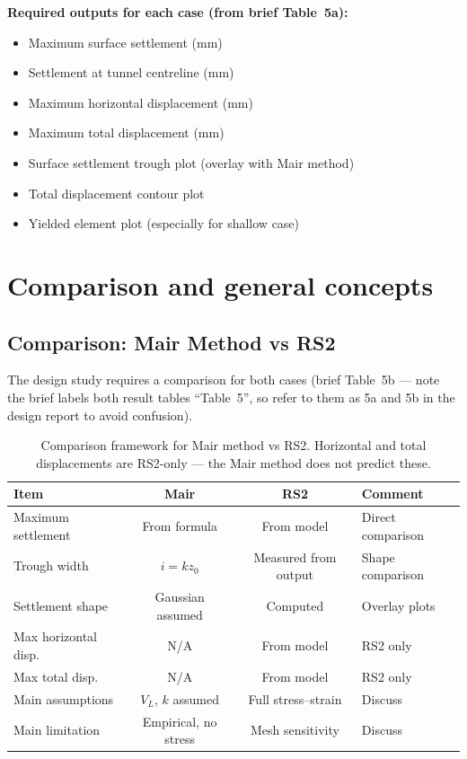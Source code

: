 \textbf{Required outputs for each case (from brief Table~5a):}
\begin{itemize}
 \item Maximum surface settlement (mm)
 \item Settlement at tunnel centreline (mm)
 \item Maximum horizontal displacement (mm)
 \item Maximum total displacement (mm)
 \item Surface settlement trough plot (overlay with Mair method)
 \item Total displacement contour plot
 \item Yielded element plot (especially for shallow case)
\end{itemize}

\section{Comparison and general concepts}
\label{sec:comparison-and-general-concepts}

\subsection{Comparison: Mair Method vs RS2}
The design study requires a comparison for both cases (brief Table~5b --- note the brief labels both result tables ``Table~5'', so refer to them as 5a and 5b in the design report to avoid confusion).

\begin{table}[h!]
\centering
\small
\begin{tabularx}{\textwidth}{l c c X}
\toprule
\textbf{Item} & \textbf{Mair} & \textbf{RS2} & \textbf{Comment} \\
\midrule
Maximum settlement & From formula & From model & Direct comparison \\
Trough width & $i = k z_0$ & Measured from output & Shape comparison \\
Settlement shape & Gaussian assumed & Computed & Overlay plots \\
Max horizontal disp. & N/A & From model & RS2 only \\
Max total disp. & N/A & From model & RS2 only \\
Main assumptions & $V_L$, $k$ assumed & Full stress--strain & Discuss \\
Main limitation & Empirical, no stress & Mesh sensitivity & Discuss \\
\bottomrule
\end{tabularx}
\caption{Comparison framework for Mair method vs RS2. Horizontal and total displacements are RS2-only --- the Mair method does not predict these.}
\label{tab:comparison}
\end{table}

